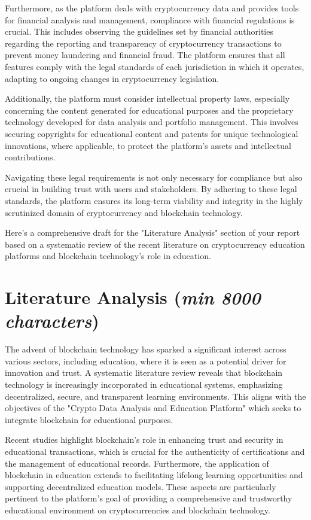 \documentclass[12pt]{report}
\newcommand{\characters}[1]{(\textit{min #1 characters})}
\begin{document}
Furthermore, as the platform deals with cryptocurrency data and provides tools for financial analysis and management, compliance with financial regulations is crucial. This includes observing the guidelines set by financial authorities regarding the reporting and transparency of cryptocurrency transactions to prevent money laundering and financial fraud. The platform ensures that all features comply with the legal standards of each jurisdiction in which it operates, adapting to ongoing changes in cryptocurrency legislation.

Additionally, the platform must consider intellectual property laws, especially concerning the content generated for educational purposes and the proprietary technology developed for data analysis and portfolio management. This involves securing copyrights for educational content and patents for unique technological innovations, where applicable, to protect the platform’s assets and intellectual contributions.

Navigating these legal requirements is not only necessary for compliance but also crucial in building trust with users and stakeholders. By adhering to these legal standards, the platform ensures its long-term viability and integrity in the highly scrutinized domain of cryptocurrency and blockchain technology.



Here's a comprehensive draft for the "Literature Analysis" section of your report based on a systematic review of the recent literature on cryptocurrency education platforms and blockchain technology's role in education.

\section{Literature Analysis \characters{8000}}
The advent of blockchain technology has sparked a significant interest across various sectors, including education, where it is seen as a potential driver for innovation and trust. A systematic literature review reveals that blockchain technology is increasingly incorporated in educational systems, emphasizing decentralized, secure, and transparent learning environments. This aligns with the objectives of the "Crypto Data Analysis and Education Platform" which seeks to integrate blockchain for educational purposes.

Recent studies highlight blockchain's role in enhancing trust and security in educational transactions, which is crucial for the authenticity of certifications and the management of educational records. Furthermore, the application of blockchain in education extends to facilitating lifelong learning opportunities and supporting decentralized education models. These aspects are particularly pertinent to the platform's goal of providing a comprehensive and trustworthy educational environment on cryptocurrencies and blockchain technology.
\end{document}
